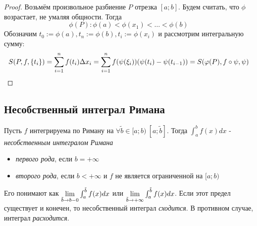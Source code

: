 \begin{proof}
	Возьмём произвольное разбиение $P$ отрезка $[a; b]$. Будем считать, что $\phi$ возрастает, не умаляя общности. Тогда
	\[
		\phi(P) \colon \phi(a) < \phi(x_1) < \ldots < \phi(b)
	\]
	Обозначим $t_0 := \phi(a), t_n := \phi(b), t_i := \phi(x_i)$ и рассмотрим интегральную сумму:
	\[
		S(P, f, \{t_i\}) = \sum\limits_{i = 1}^n f(t_i) \Delta x_i = \sum\limits_{i = 1}^n f(\psi(\xi_i))(\psi(t_i) - \psi(t_{i - 1})) = S(\varphi(P), f \circ \psi, \psi)
	\]
\end{proof}

\subsection{Несобственный интеграл Римана}

\begin{definition}
	Пусть $f$ интегрируема по Риману на $\forall \tilde{b} \in [a; b)\ [a; \tilde{b}]$. Тогда $\int_a^b f(x)dx$ - \textit{несобственным интегралом Римана}
	\begin{itemize}
		\item \textit{первого рода}, если $b = +\infty$
		
		\item \textit{второго рода}, если $b < +\infty$ и $f$ не является ограниченной на $[a; b)$
	\end{itemize}
	Его понимают как $\lim\limits_{\tilde{b} \to b-0} \int_a^{\tilde{b}} f(x)dx$ или $\lim\limits_{\tilde{b} \to +\infty} \int_a^{\tilde{b}} f(x)dx$. Если этот предел существует и конечен, то несобственный интеграл \textit{сходится}. В противном случае, интеграл \textit{расходится}.
\end{definition}